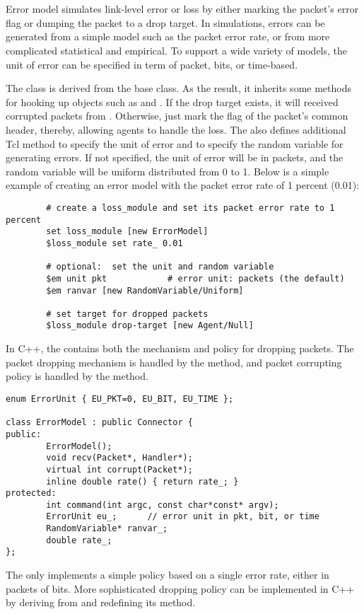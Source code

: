 %
%
\section{}

Error model simulates link-level error or loss by either marking the
packet's error flag or dumping the packet to a drop target.  In
simulations, errors can be generated from a simple model such as the
packet error rate, or from more complicated statistical and empirical.
To support a wide variety of models, the unit of error can be specified
in term of packet, bits, or time-based.

The  class is derived from the  base
class.  As the result, it inherits some methods for hooking up objects
such as  and .  If the drop target
exists, it will received corrupted packets from .
Otherwise,  just mark the  flag of the
packet's common header, thereby, allowing agents to handle the loss.
The  also defines additional Tcl method  to
specify the unit of error and  to specify the random
variable for generating errors.  If not specified, the unit of error
will be in packets, and the random variable will be uniform distributed
from 0 to 1.  Below is a simple example of creating an error model with
the packet error rate of 1 percent (0.01):

\begin{verbatim}
        # create a loss_module and set its packet error rate to 1 percent
        set loss_module [new ErrorModel]
        $loss_module set rate_ 0.01

        # optional:  set the unit and random variable
        $em unit pkt            # error unit: packets (the default)
        $em ranvar [new RandomVariable/Uniform]

        # set target for dropped packets
        $loss_module drop-target [new Agent/Null]
\end{verbatim}

In C++, the  contains both the mechanism and policy for
dropping packets.  The packet dropping mechanism is handled by the
 method, and packet corrupting policy is handled by the
 method.

\begin{verbatim}
enum ErrorUnit { EU_PKT=0, EU_BIT, EU_TIME };

class ErrorModel : public Connector {
public:
        ErrorModel();
        void recv(Packet*, Handler*);
        virtual int corrupt(Packet*);
        inline double rate() { return rate_; }
protected:
        int command(int argc, const char*const* argv);
        ErrorUnit eu_;		// error unit in pkt, bit, or time
        RandomVariable* ranvar_;
        double rate_;
};
\end{verbatim}

The  only implements a simple policy based on a single
error rate, either in packets of bits.  More sophisticated dropping
policy can be implemented in C++ by deriving from  and
redefining its  method.
